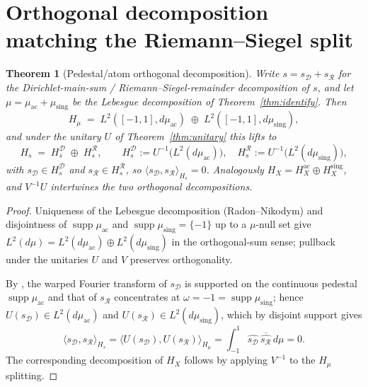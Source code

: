 \documentclass[11pt]{article}
\newtheorem{theorem}{Theorem}
\theoremstyle{definition}
\DeclareMathOperator{\supp}{supp}
\begin{document}
\section{Orthogonal decomposition matching the Riemann--Siegel split}
\label{sec:ortho}

\begin{theorem}[Pedestal/atom orthogonal decomposition]\label{thm:ortho}
Write $s=s_{\mathcal{D}}+s_{\mathcal{R}}$ for the Dirichlet-main-sum /
Riemann--Siegel-remainder decomposition of $s$, and let
$\mu=\mu_{\mathrm{ac}}+\mu_{\mathrm{sing}}$ be the Lebesgue decomposition
of Theorem~\ref{thm:identify}. Then
\[
H_{\mu}\;=\;L^{2}([-1,1],d\mu_{\mathrm{ac}})\;\oplus\;L^{2}([-1,1],d\mu_{\mathrm{sing}}),
\]
and under the unitary $U$ of Theorem~\ref{thm:unitary} this lifts to
\[
H_{s}\;=\;H_{s}^{\mathcal{D}}\;\oplus\;H_{s}^{\mathcal{R}},\qquad
H_{s}^{\mathcal{D}}:=U^{-1}\bigl(L^{2}(d\mu_{\mathrm{ac}})\bigr),\quad
H_{s}^{\mathcal{R}}:=U^{-1}\bigl(L^{2}(d\mu_{\mathrm{sing}})\bigr),
\]
with $s_{\mathcal{D}}\in H_{s}^{\mathcal{D}}$ and $s_{\mathcal{R}}\in H_{s}^{\mathcal{R}}$,
so $\langle s_{\mathcal{D}},s_{\mathcal{R}}\rangle_{H_{s}}=0$. Analogously
$H_{X}=H_{X}^{\mathrm{ac}}\oplus H_{X}^{\mathrm{sing}}$, and
$V^{-1}U$ intertwines the two orthogonal decompositions.
\end{theorem}

\begin{proof}
Uniqueness of the Lebesgue decomposition (Radon--Nikodym) and disjointness
of $\supp\mu_{\mathrm{ac}}$ and $\supp\mu_{\mathrm{sing}}=\{-1\}$ up to a
$\mu$-null set give
$L^{2}(d\mu)=L^{2}(d\mu_{\mathrm{ac}})\oplus L^{2}(d\mu_{\mathrm{sing}})$ in
the orthogonal-sum sense; pullback under the unitaries $U$ and $V$
preserves orthogonality.

By \cite[§5, Proposition~3]{exposition}, the warped Fourier transform of
$s_{\mathcal{D}}$ is supported on the continuous pedestal
$\supp\mu_{\mathrm{ac}}$ and that of $s_{\mathcal{R}}$ concentrates at
$\omega=-1=\supp\mu_{\mathrm{sing}}$; hence
$U(s_{\mathcal{D}})\in L^{2}(d\mu_{\mathrm{ac}})$ and
$U(s_{\mathcal{R}})\in L^{2}(d\mu_{\mathrm{sing}})$, which by disjoint
support gives
\[
\langle s_{\mathcal{D}},s_{\mathcal{R}}\rangle_{H_{s}}
=\langle U(s_{\mathcal{D}}),U(s_{\mathcal{R}})\rangle_{H_{\mu}}
=\int_{-1}^{1}\!\widehat{s_{\mathcal{D}}}\,\overline{\widehat{s_{\mathcal{R}}}}\,d\mu=0.
\]
The corresponding decomposition of $H_{X}$ follows by applying $V^{-1}$ to
the $H_{\mu}$ splitting.
\end{proof}
\end{document}
